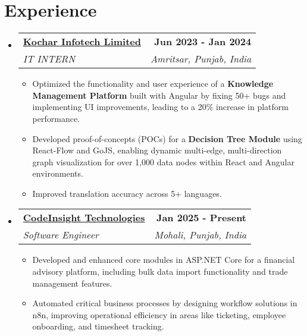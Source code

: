 \documentclass[letterpaper,11pt]{article}
\makeatletter
\newcommand{\resumeItem}[1]{
  \item\small{
    {#1 \vspace{-2pt}}
  }
}
\newcommand{\resumeSubheading}[4]{
  \vspace{-2pt}\item
    \begin{tabular*}{1.0\textwidth}[t]{l@{\extracolsep{\fill}}r}
      \textbf{#1} & \textbf{\small #2} \\
      \textit{\small#3} & \textit{\small #4} \\
    \end{tabular*}\vspace{-7pt}
}
\newcommand{\resumeSubHeadingListStart}{\begin{itemize}[leftmargin=0.0in, label={}]}
\newcommand{\resumeSubHeadingListEnd}{\end{itemize}}
\newcommand{\resumeItemListStart}{\justify \begin{itemize} \vspace{-4pt}}
\newcommand{\resumeItemListEnd}{\end{itemize}\vspace{-1pt}}
\makeatother
\begin{document}
\section{Experience}
  \resumeSubHeadingListStart
    \resumeSubheading
      {\href{https://www.kochartech.com/}{Kochar Infotech Limited}}{Jun 2023 - Jan 2024}
      {IT INTERN}{Amritsar, Punjab, India}
      \resumeItemListStart
        \resumeItem{Optimized the functionality and user experience of a \textbf{Knowledge Management Platform} built with Angular by fixing 50+ bugs and implementing UI improvements, leading to a 20\% increase in platform performance.}
        \resumeItem{Developed proof-of-concepts (POCs) for a \textbf{Decision Tree Module} using React-Flow and GoJS, enabling dynamic multi-edge, multi-direction graph visualization for over 1,000 data nodes within React and Angular environments.}
        \resumeItem{Improved translation accuracy across 5+ languages.}
      \resumeItemListEnd
    
    \resumeSubheading
      {\href{https://www.thecodeinsight.com/}{CodeInsight Technologies}}{Jan 2025 - Present}
      {Software Engineer}{Mohali, Punjab, India}
      \resumeItemListStart
        \resumeItem{Developed and enhanced core modules in ASP.NET Core for a financial advisory platform, including bulk data import functionality and trade management features.}
        \resumeItem{Automated critical business processes by designing workflow solutions in n8n, improving operational efficiency in areas like ticketing, employee onboarding, and timesheet tracking.}
      \resumeItemListEnd
  \resumeSubHeadingListEnd




\end{document}
